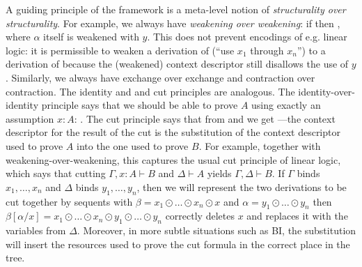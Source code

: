 
A guiding principle of the framework is a meta-level notion of
\emph{structurality over structurality}.  For example, we always have
\emph{weakening over weakening}: if  then
, where $\alpha$ itself is weakened with $y$.
This does not prevent encodings of e.g. linear logic: it is permissible
to weaken a derivation of 
(``use $x_1$ through $x_n$'') to a derivation of  because the (weakened) context descriptor
still disallows the use of $y$.  Similarly, we always have exchange over
exchange and contraction over contraction.  The identity and and cut
principles are analogous.  The identity-over-identity principle says
that we should be able to prove $A$ using exactly an assumption $x:A$:
{}.  The cut principle says that from
 and  we get
{}---the context descriptor
for the result of the cut is the substitution of the context
descriptor used to prove $A$ into the one used to prove $B$.  For
example, together with weakening-over-weakening, this captures the
usual cut principle of linear logic, which says that cutting
$\Gamma,x:A \vdash B$ and $\Delta \vdash A$ yields $\Gamma,\Delta
\vdash B$.  If $\Gamma$ binds $x_1,\ldots,x_n$ and $\Delta$ binds
$y_1,\ldots,y_n$, then we will represent the two derivations to be
cut together by sequents with $\beta = x_1 \odot \ldots \odot x_n
\odot x$ and $\alpha = y_1 \odot \ldots \odot y_n$ then
$\beta[\alpha/x] = x_1 \odot \ldots \odot x_n \odot y_1 \odot \ldots \odot y_n$
correctly deletes $x$ and replaces it with the variables from $\Delta$.
Moreover, in more subtle situations such as BI, the substitution will
insert the resources used to prove the cut formula in the correct place
in the tree.

